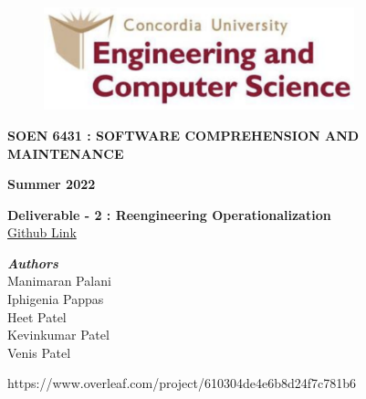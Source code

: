 \documentclass[letterpaper, 11pt]{report}
\begin{document}
\begin{titlepage}
\vspace*{0.7in}
\begin{center}
\begin{figure}[htb]
\begin{center}
\includegraphics[width=9cm]{D1-Reengineering Opportunity/images/univ_logo.png}
\end{center}
\end{figure}
\vspace*{0.3in}
\begin{Large}
\textbf{SOEN 6431 : SOFTWARE COMPREHENSION AND MAINTENANCE} \\
\end{Large}
\vspace*{0.1in}
\begin{Large}
\textbf{Summer 2022} \\
\end{Large}
\vspace*{0.9in}
\begin{Large}
\textbf{Deliverable - 2 : Reengineering Operationalization} \\
\href{https://github.com/manimayan/SOEN_6431_Deja_Vu}{Github Link}\\
\end{Large}
\vspace*{0.75in}
\begin{Large}
\textbf{\emph{Authors}} \\
\vspace*{0.2in}
Manimaran Palani\\
Iphigenia Pappas\\
Heet Patel\\
Kevinkumar Patel\\
Venis Patel \\
\end{Large}
\end{center}
\begin{center}
\vspace*{0.9in}
https://www.overleaf.com/project/610304de4e6b8d24f7c781b6\end{center}
\end{titlepage}
\end{document}

